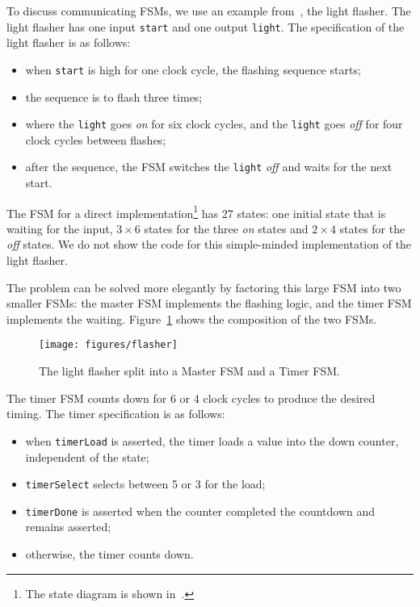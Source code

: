 \documentclass[%
    10pt,
    headinclude, footexclude,
    openright, %
    notitlepage,
    cleardoubleempty,
    headsepline,
    pointlessnumbers,
    bibtotoc, idxtotoc,
    ]{scrbook}
\newcommand{\code}[1]{{\small{\texttt{#1}}}}
\newcommand{\scale}{0.7}
\begin{document}
To discuss communicating FSMs, we use an example
from~\cite[Chapter~17]{dally:vhdl:2016}, the light flasher.
The light flasher has one input \code{start} and one output
\code{light}. The specification of the light flasher is as follows:
\begin{itemize}
\item when \code{start} is high for one clock cycle, the flashing
sequence starts;
\item the sequence is to flash three times;
\item where the \code{light} goes \emph{on} for six clock cycles, and the \code{light} goes \emph{off} for four clock cycles between flashes;
\item after the sequence, the FSM switches the \code{light} \emph{off} and waits
for the next start.
\end{itemize}

The FSM for a direct implementation\footnote{The state diagram is shown
in~\cite[p.~376]{dally:vhdl:2016}.} has 27 states:
one initial state that is waiting for the input, $3 \times 6$ states for the three
\emph{on} states and $2 \times 4$ states for the \emph{off} states.
We do not show the code for this simple-minded implementation of the light
flasher.

The problem can be solved more elegantly by factoring this large FSM into
two smaller FSMs: the master FSM implements the flashing logic, and the timer FSM
implements the waiting. Figure~\ref{fig:flasher} shows the composition of
the two FSMs.

\begin{figure}
  \centering
  \texttt{[image: figures/flasher]}
  \caption{The light flasher split into a Master FSM and a Timer FSM.}
  \label{fig:flasher}
\end{figure}

The timer FSM counts down for 6 or 4 clock cycles to produce the desired timing.
The timer specification is as follows:

\begin{itemize}
\item when \code{timerLoad} is asserted, the timer loads a value into the down counter,
independent of the state;
\item \code{timerSelect} selects between 5 or 3 for the load;
\item \code{timerDone} is asserted when the counter completed the countdown
and remains asserted;
\item otherwise, the timer counts down.
\end{itemize}
\end{document}

